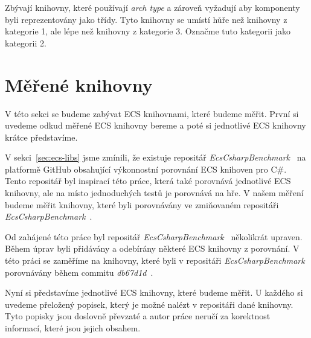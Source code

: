 Zbývají knihovny, které používají \textit{arch type} a zároveň vyžadují aby komponenty byli reprezentovány jako třídy. Tyto knihovny se umístí hůře než knihovny z kategorie 1, ale lépe než knihovny z kategorie 3. Označme tuto kategorii jako kategorii 2.

\section{Měřené knihovny}
V této sekci se budeme zabývat ECS knihovnami, které budeme měřit. První si uvedeme odkud měřené ECS knihovny bereme a poté si jednotlivé ECS knihovny krátce představíme.

V sekci~\ref{sec:ecs-libs} jsme zmínili, že existuje repositář \textit{EcsCsharpBenchmark}~\cite{EcsCsharpBenchmark} na platformě GitHub obsahující výkonnostní porovnání ECS knihoven pro C\#. Tento repositář byl inspirací této práce, která také porovnává jednotlivé ECS knihovny, ale na místo jednoduchých testů je porovnává na hře. V našem měření budeme měřit knihovny, které byli porovnávány ve zmiňovaném repositáři \textit{EcsCsharpBenchmark}~\cite{EcsCsharpBenchmark}.

Od zahájené této práce byl repositář \textit{EcsCsharpBenchmark}~\cite{EcsCsharpBenchmark} několikrát upraven. Během úprav byli přidávány a odebírány některé ECS knihovny z porovnání. V této práci se zaměříme na knihovny, které byli v repositáři \textit{EcsCsharpBenchmark}~\cite{EcsCsharpBenchmark} porovnávány během commitu \textit{db67d1d}~\cite{EcsCsharpBenchmarkCommit}.

Nyní si představíme jednotlivé ECS knihovny, které budeme měřit. U každého si uvedeme přeložený popisek, který je možné nalézt v repositáři dané knihovny. Tyto popisky jsou doslovně převzaté a autor práce neručí za korektnost informací, které jsou jejich obsahem.

